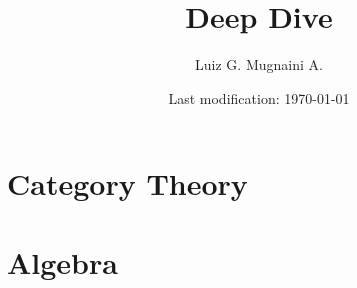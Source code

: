 

\newcommand{\onlyinsubfile}[1]{#1}
\newcommand{\notinsubfile}[1]{}

\author{Luiz G. Mugnaini A.}
\date{Last modification: \today}
\title{Deep Dive}



\renewcommand{\onlyinsubfile}[1]{}
\renewcommand{\notinsubfile}[1]{#1}

\frontmatter

% 
\maketitle

\tableofcontents
\listoftodos




\mainmatter

\part{Category Theory}



\part{Algebra}

